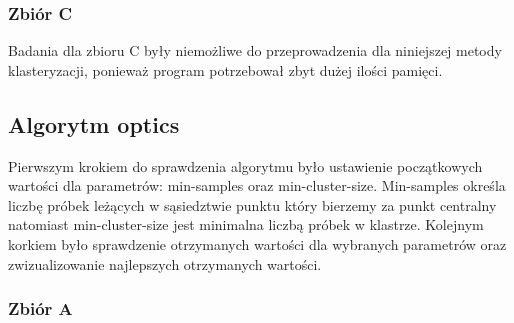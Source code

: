 \documentclass[a4paper,11pt]{article}
\begin{document}
\subsubsection*{Zbiór C}
Badania dla zbioru C były niemożliwe do przeprowadzenia dla niniejszej metody klasteryzacji, ponieważ program potrzebował zbyt dużej ilości pamięci.

\subsection{Algorytm optics}
Pierwszym krokiem do sprawdzenia algorytmu było ustawienie początkowych wartości dla parametrów: min-samples oraz min-cluster-size. Min-samples określa liczbę próbek leżących w sąsiedztwie punktu który bierzemy za punkt centralny natomiast min-cluster-size jest minimalna liczbą próbek w klastrze. Kolejnym korkiem było sprawdzenie otrzymanych wartości dla wybranych parametrów oraz zwizualizowanie najlepszych otrzymanych wartości.
\subsubsection*{Zbiór A}
\end{document}
